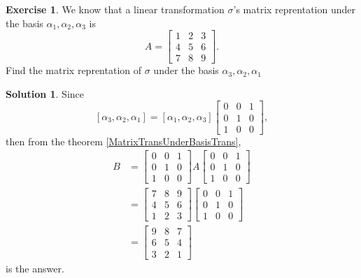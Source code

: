\documentclass{article}
\theoremstyle{definition}
\newtheorem{exe}{Exercise}[section]
\newtheorem{sol}{Solution}[exe]
\begin{document}
\begin{exe}
    We know that a linear transformation $\sigma$'s matrix reprentation under the 
    basis $\alpha_{1},\alpha_{2},\alpha_{3}$ is 
    $$ A=
    \begin{bmatrix}
        1&2&3\\
        4&5&6\\
        7&8&9
    \end{bmatrix}.$$
    Find the matrix reprentation of $\sigma$ under the basis $\alpha_{3},\alpha_{2},\alpha_{1}$
\end{exe}
\begin{sol}
    Since
    $$
    [\alpha_{3},\alpha_{2},\alpha_{1}]
    =[\alpha_{1},\alpha_{2},\alpha_{3}]
    \begin{bmatrix}
        0&0&1\\
        0&1&0\\
        1&0&0
    \end{bmatrix}
    ,$$
    then from the theorem \ref{MatrixTransUnderBasisTrans}, 
    \begin{align*}
    B
    & =
    \begin{bmatrix}
        0&0&1\\
        0&1&0\\
        1&0&0
    \end{bmatrix}
    A
    \begin{bmatrix}
        0&0&1\\
        0&1&0\\
        1&0&0
    \end{bmatrix}\\
    &=
    \begin{bmatrix}
        7&8&9\\
        4&5&6\\
        1&2&3
    \end{bmatrix}
    \begin{bmatrix}
        0&0&1\\
        0&1&0\\
        1&0&0
    \end{bmatrix}\\
    &=
    \begin{bmatrix}
        9&8&7\\
        6&5&4\\
        3&2&1
    \end{bmatrix}
    \end{align*}
    is the answer.
\end{sol}
\end{document}
